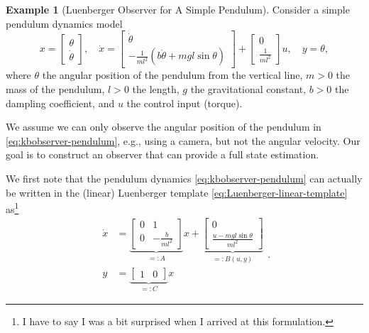 \documentclass[
]{book}
\theoremstyle{definition}
\theoremstyle{definition}
\newtheorem{example}{Example}[chapter]
\theoremstyle{definition}
\theoremstyle{definition}
\theoremstyle{remark}
\begin{document}
\begin{example}[Luenberger Observer for A Simple Pendulum]
\protect\hypertarget{exm:pendulumLuenberger}{}\label{exm:pendulumLuenberger}Consider a simple pendulum dynamics model
\begin{equation}
x = \begin{bmatrix}
\theta \\ \dot{\theta}
\end{bmatrix}, \quad 
\dot{x} = \begin{bmatrix} 
\dot{\theta} \\
- \frac{1}{ml^2} (b \dot{\theta} + mgl \sin \theta) 
\end{bmatrix} + 
\begin{bmatrix}
0 \\
\frac{1}{ml^2} 
\end{bmatrix} u, \quad y = \theta,
\label{eq:kbobserver-pendulum}
\end{equation}
where \(\theta\) the angular position of the pendulum from the vertical line, \(m > 0\) the mass of the pendulum, \(l > 0\) the length, \(g\) the gravitational constant, \(b > 0\) the dampling coefficient, and \(u\) the control input (torque).

We assume we can only observe the angular position of the pendulum in \eqref{eq:kbobserver-pendulum}, e.g., using a camera, but not the angular velocity. Our goal is to construct an observer that can provide a full state estimation.

We first note that the pendulum dynamics \eqref{eq:kbobserver-pendulum} can actually be written in the (linear) Luenberger template \eqref{eq:Luenberger-linear-template} as\footnote{I have to say I was a bit surprised when I arrived at this formulation.}
\begin{equation}
\begin{split}
\dot{x} & = \underbrace{\begin{bmatrix}
0 & 1 \\
0 & - \frac{b}{ml^2}
\end{bmatrix}}_{=:A} x + 
\underbrace{\begin{bmatrix}
0 \\
\frac{u - mgl \sin \theta }{ml^2}
\end{bmatrix}}_{=:B(u,y)} \\
y & = \underbrace{\begin{bmatrix}
1 & 0
\end{bmatrix}}_{=:C} x 
\end{split}.
\label{eq:pendulum-Luenberger-Linear}
\end{equation}


\end{example}
\end{document}
